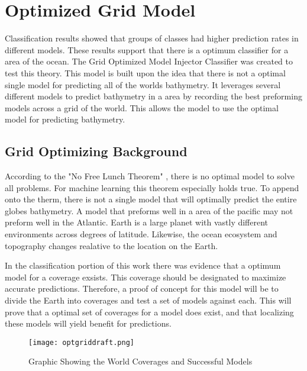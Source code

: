 \section{Optimized Grid Model}
\setlength{\parindent}{10ex}
Classification results showed that groups of classes had higher prediction rates in different models.
These results support that there is a optimum classifier for a area of the ocean.
The Grid Optimized Model Injector Classifier was created to test this theory.
This model is built upon the idea that there is not a optimal single model for predicting all of the worlds bathymetry.
It leverages several different models to predict bathymetry in a area by recording the best preforming models across a grid of the world.
This allows the model to use the optimal model for predicting bathymetry.

\subsection{Grid Optimizing Background}
According to the "No Free Lunch Theorem" \cite{wolpert1997no}, there is no optimal model to solve all problems.
For machine learning this theorem especially holds true.
To append onto the therm, there is not a single model that will optimally predict the entire globes bathymetry.
A model that preforms well in a area of the pacific may not preform well in the Atlantic.
Earth is a large planet with vastly different environments across degrees of latitude.
Likewise, the ocean ecosystem and topography changes realative to the location on the Earth.

\par
In the classification portion of this work there was evidence that a optimum model for a coverage exsists.
This coverage should be designated to maximize accurate predictions.
Therefore, a proof of concept for this model will be to divide the Earth into coverages and test a set of models against each.
This will prove that a optimal set of coverages for a model does exist, and that localizing these models will yield benefit for predictions.

\begin{figure}[h]
    \centering
    \texttt{[image: optgriddraft.png]}
    \caption{Graphic Showing the World Coverages and Successful Models}
    \label{fig:coveragegrid}
\end{figure}

